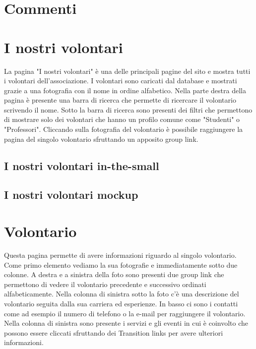     \section{Commenti}
    \section{I nostri volontari}
    La pagina "I nostri volontari" è una delle principali pagine del sito e
    mostra tutti i volontari dell'associazione. I volontari sono caricati dal
    database e mostrati grazie a una fotografia con il nome in ordine
    alfabetico. Nella parte destra della pagina è presente una barra di ricerca
    che permette di ricercare il volontario scrivendo il nome. Sotto la barra di
    ricerca sono presenti dei filtri che permettono di mostrare solo dei
    volontari che hanno un profilo comune come "Studenti" o "Professori".
    Cliccando sulla fotografia del volontario è possibile raggiungere la pagina
    del singolo volontario sfruttando un apposito group link.

        \subsection{I nostri volontari in-the-small}

        \subsection{I nostri volontari mockup}

    \section{Volontario}
    Questa pagina permette di avere informazioni riguardo al singolo volontario.
    Come primo elemento vediamo la sua fotografie e immediatamente sotto due
    colonne. A destra e a sinistra della foto sono presenti due group link che
    permettono di vedere il volontario precedente e successivo ordinati
    alfabeticamente. Nella colonna di sinistra sotto la foto c'è una descrizione del
    volontario seguita dalla sua carriera ed esperienze. In basso ci sono i
    contatti come ad esempio il numero di telefono o la e-mail per raggiungere
    il volontario. Nella colonna di sinistra sono presente i servizi e gli
    eventi in cui è coinvolto che possono essere cliccati sfruttando dei
    Transition links per avere ulteriori informazioni.

